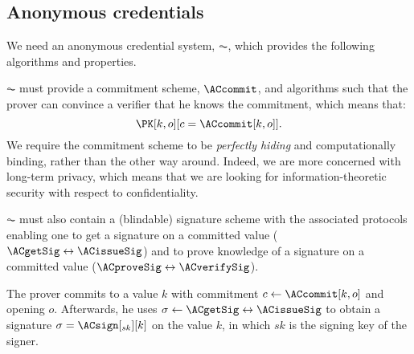\subsection{Anonymous credentials}%
\label{ZK-anon-cred}



We need an anonymous credential system, \(\AC\), which provides the following algorithms and properties.


\(\AC\) must provide a commitment scheme, \(\ACcommit\), and algorithms such that the prover can convince a verifier that he knows the commitment, which means that:
\begin{equation*}
  \PK[k, o][c = \ACcommit[k,o]].
\end{equation*}
We require the commitment scheme to be \emph{perfectly hiding} and computationally binding, rather than the other way around.
Indeed, we are more concerned with long-term privacy, which means that we are looking for information-theoretic security with respect to confidentiality.


\(\AC\) must also contain a (blindable) signature scheme with the associated protocols enabling one to get a signature on a committed value (\(\ACgetSig\leftrightarrow \ACissueSig\)) and to prove knowledge of a signature on a committed value (\(\ACproveSig\leftrightarrow \ACverifySig\)).

The prover commits to a value \(k\) with commitment \(c\gets \ACcommit[k, o]\) and opening \(o\).
Afterwards, he uses \(\sigma\gets \ACgetSig\leftrightarrow \ACissueSig\) to obtain a signature \(\sigma = \ACsign[_{sk}][k]\) on the value \(k\), in which \(sk\) is the signing key of the signer.

